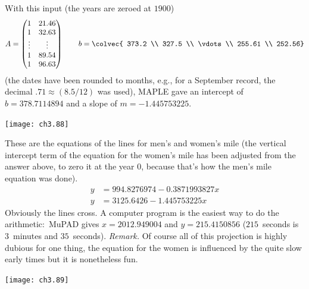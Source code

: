\begin{ans}{4}
    With this input (the years are zeroed at $1900$)
    \begin{equation*}
      A =
      \begin{pmatrix}
         1 & 21.46 \\
         1 & 32.63 \\
        \vdots  &\vdots     \\
         1 & 89.54  \\
         1 & 96.63
      \end{pmatrix}
      \qquad
      b =
      \colvec{ 373.2 \\
               327.5 \\
              \vdots  \\
               255.61 \\
               252.56}
    \end{equation*}
     (the dates have been rounded to months, e.g., for a September record,
     the decimal $.71\approx (8.5/12)$ was used),
     MAPLE gave an intercept of $b=378.7114894$ and a slope of
    $m=-1.445753225$.
    \begin{center}  \small
      \texttt{[image: ch3.88]}
    \end{center}
   
\end{ans}
\begin{ans}{5}
    These are the equations of the lines for men's and women's mile
    (the vertical intercept term of the equation
    for the women's mile has been adjusted from the answer above,
    to zero it at the year $0$,
    because that's how the men's mile equation was done).
    \begin{align*}
        y &=994.8276974-0.3871993827x  \\
        y &=3125.6426-1.445753225x
    \end{align*}
    Obviously the lines cross.
    A computer program  is the easiest way to do the
    arithmetic:~MuPAD gives $x=2012.949004$ and $y=215.4150856$
    ($215$~seconds is $3$~minutes and $35$~seconds).
    \textit{Remark.}
    Of course all of this projection is highly dubious \Dash  for one thing,
    the equation for the women is influenced by the quite slow early
    times \Dash  but it is nonetheless fun.
     \begin{center}  \small
       \texttt{[image: ch3.89]}
     \end{center}
  
\end{ans}
